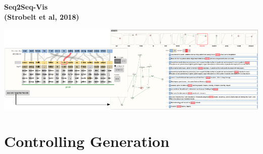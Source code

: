 \documentclass[aspectratio=169,12pt]{beamer}
\begin{document}
\begin{frame}
  \begin{center}
    \textbf{Seq2Seq-Vis \\ {\small (Strobelt et al, 2018)} }
  \end{center}

  \includegraphics[width=\textwidth]{s2stease}
\end{frame}

\section{Controlling Generation}
\end{document}
